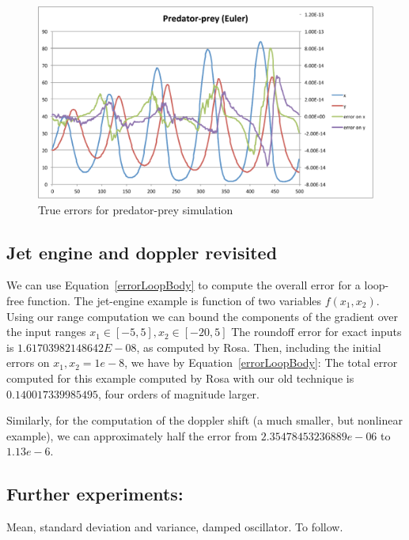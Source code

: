 \documentclass[10pt]{article}
\begin{document}
\begin{figure}[h!]
  \centering
\includegraphics[width=\textwidth]{images/predator-prey}
  \caption{True errors for predator-prey simulation}
\label{fig:predator}
\end{figure}

\subsection{Jet engine and doppler revisited}
We can use Equation~\ref{errorLoopBody} to compute the overall error for
a loop-free function.
The jet-engine example is function of two variables $f(x_1, x_2)$.
Using our range computation we can bound the components of the gradient
over the input ranges $x_1 \in [-5, 5], x_2 \in [-20, 5]$
The roundoff error for exact inputs is $1.61703982148642E-08$, as computed by Rosa.
Then, including the initial errors on $x_1, x_2 = 1e-8$, we have by
Equation~\ref{errorLoopBody}:
The total error computed for this example computed by Rosa with our old technique
is $0.140017339985495$, four orders of magnitude larger.

Similarly, for the computation of the doppler shift (a much smaller, but nonlinear example),
we can approximately half the error from $2.35478453236889e-06$ to $1.13e-6$.

\subsection{Further experiments:}
Mean, standard deviation and variance, damped oscillator.
To follow.




\end{document}
